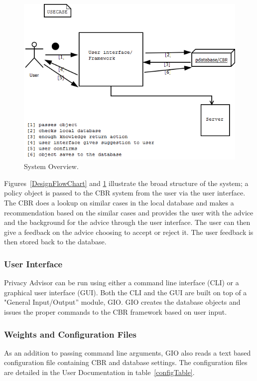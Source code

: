 \begin{figure}[htbp]
\begin{center}
\includegraphics[width = \textwidth]{DesignReport/uml/Case.png}
\caption{System Overview.}
\label{SystemOverview}
\end{center}
\end{figure}

Figures~\ref{DesignFlowChart} and \ref{SystemOverview} illustrate the broad structure of the system; a policy object is passed to the CBR system from the user via the user interface. The CBR does a lookup on similar cases in the local database and makes a recommendation based on the similar cases and provides the user with the advice and the background for the advice through the user interface. The user can then give a feedback on the advice choosing to accept or reject it. The user feedback is then stored back to the database.

\subsubsection{User Interface}
Privacy Advisor can be run using either a command line interface (CLI) or a graphical user interface (GUI). Both the CLI and the GUI are built on top of a "General Input/Output'' module, GIO. GIO creates the database objects and issues the proper commands to the CBR framework based on user input.

\subsubsection{Weights and Configuration Files}
As an addition to passing command line arguments, GIO also reads a text based configuration file containing CBR and database settings. The configuration files are detailed in the User Documentation in table~\ref{configTable}. 

